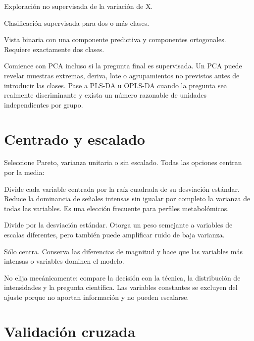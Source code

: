 \documentclass[11pt,a4paper,openany]{report}
\begin{document}
\begin{description}[leftmargin=3.2cm,style=nextline]
  \item[PCA] Exploración no supervisada de la variación de X.
  \item[PLS-DA] Clasificación supervisada para dos o más clases.
  \item[OPLS-DA] Vista binaria con una componente predictiva y componentes
  ortogonales. Requiere exactamente dos clases.
\end{description}

Comience con PCA incluso si la pregunta final es supervisada. Un PCA puede
revelar muestras extremas, deriva, lote o agrupamientos no previstos antes de
introducir las clases. Pase a PLS-DA u OPLS-DA cuando la pregunta sea realmente
discriminante y exista un número razonable de unidades independientes por grupo.

\section{Centrado y escalado}

Seleccione Pareto, varianza unitaria o sin escalado. Todas las opciones centran
por la media:

\begin{description}[leftmargin=3.2cm,style=nextline]
  \item[Pareto] Divide cada variable centrada por la raíz cuadrada de su
  desviación estándar. Reduce la dominancia de señales intensas sin igualar por
  completo la varianza de todas las variables. Es una elección frecuente para
  perfiles metabolómicos.
  \item[Varianza unitaria] Divide por la desviación estándar. Otorga un peso
  semejante a variables de escalas diferentes, pero también puede amplificar
  ruido de baja varianza.
  \item[Sin escalado] Sólo centra. Conserva las diferencias de magnitud y hace
  que las variables más intensas o variables dominen el modelo.
\end{description}

No elija mecánicamente: compare la decisión con la técnica, la distribución de
intensidades y la pregunta científica. Las variables constantes se excluyen del
ajuste porque no aportan información y no pueden escalarse.

\section{Validación cruzada}
\end{document}

